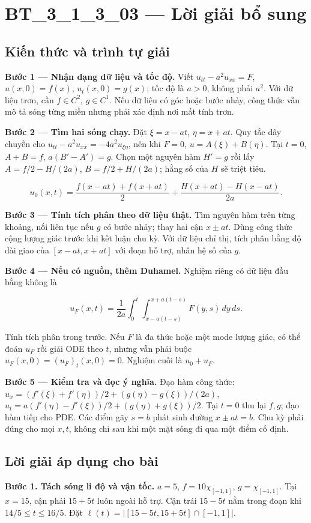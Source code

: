 \documentclass[10pt,a4paper]{article}
\begin{document}
\section*{BT\_3\_1\_3\_03 — Lời giải bổ sung}
\subsection*{Kiến thức và trình tự giải}
\textbf{Bước 1 — Nhận dạng dữ liệu và tốc độ.} Viết $u_{tt}-a^2u_{xx}=F$, $u(x,0)=f(x)$, $u_t(x,0)=g(x)$; tốc độ là $a>0$, không phải $a^2$. Với dữ liệu trơn, cần $f\in C^2$, $g\in C^1$. Nếu dữ liệu có góc hoặc bước nhảy, công thức vẫn mô tả sóng từng miền nhưng phải xác định nơi mất tính trơn.

\textbf{Bước 2 — Tìm hai sóng chạy.} Đặt $\xi=x-at$, $\eta=x+at$. Quy tắc dây chuyền cho $u_{tt}-a^2u_{xx}=-4a^2u_{\xi\eta}$, nên khi $F=0$, $u=A(\xi)+B(\eta)$. Tại $t=0$, $A+B=f$, $a(B'-A')=g$. Chọn một nguyên hàm $H'=g$ rồi lấy $A=f/2-H/(2a)$, $B=f/2+H/(2a)$; hằng số của $H$ sẽ triệt tiêu.


\[
u_0(x,t)=\frac{f(x-at)+f(x+at)}2+\frac{H(x+at)-H(x-at)}{2a}.
\]


\textbf{Bước 3 — Tính tích phân theo dữ liệu thật.} Tìm nguyên hàm trên từng khoảng, nối liên tục nếu $g$ có bước nhảy; thay hai cận $x\pm at$. Dùng công thức cộng lượng giác trước khi kết luận chu kỳ. Với dữ liệu chỉ thị, tích phân bằng độ dài giao của $[x-at,x+at]$ với đoạn hỗ trợ, nhân hệ số của $g$.

\textbf{Bước 4 — Nếu có nguồn, thêm Duhamel.} Nghiệm riêng có dữ liệu đầu bằng không là


\[
u_F(x,t)=\frac1{2a}\int_0^t\int_{x-a(t-s)}^{x+a(t-s)}F(y,s)\,dy\,ds.
\]


Tính tích phân trong trước. Nếu $F$ là đa thức hoặc một mode lượng giác, có thể đoán $u_F$ rồi giải ODE theo $t$, nhưng vẫn phải buộc $u_F(x,0)=(u_F)_t(x,0)=0$. Nghiệm cuối là $u_0+u_F$.

\textbf{Bước 5 — Kiểm tra và đọc ý nghĩa.} Đạo hàm công thức: $u_x=(f'(\xi)+f'(\eta))/2+(g(\eta)-g(\xi))/(2a)$, $u_t=a(f'(\eta)-f'(\xi))/2+(g(\eta)+g(\xi))/2$. Tại $t=0$ thu lại $f,g$; đạo hàm tiếp cho PDE. Các điểm gãy $s=b$ phát sinh đường $x\pm at=b$. Chu kỳ phải đúng cho mọi $x,t$, không chỉ sau khi một mặt sóng đi qua một điểm cố định.
\subsection*{Lời giải áp dụng cho bài}
\textbf{Bước 1. Tách sóng li độ và vận tốc.} $a=5$, $f=10\chi_{[-1,1]}$, $g=\chi_{[-1,1]}$. Tại $x=15$, cận phải $15+5t$ luôn ngoài hỗ trợ. Cận trái $15-5t$ nằm trong đoạn khi $14/5\le t\le16/5$. Đặt $\ell(t)=|[15-5t,15+5t]\cap[-1,1]|$.
\end{document}
